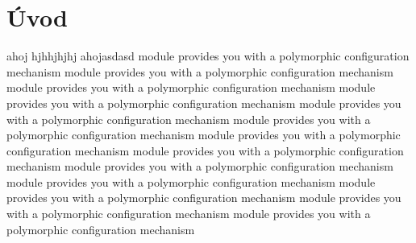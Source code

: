 

\chapter{Úvod}
ahoj
hjhhjhjhj
ahojasdasd
module provides you with a polymorphic configuration mechanism module provides you with a polymorphic configuration mechanism module provides you with a polymorphic configuration mechanism module provides you with a polymorphic configuration mechanism module provides you with a polymorphic configuration mechanism module provides you with a polymorphic configuration mechanism module provides you with a polymorphic configuration mechanism module provides you with a polymorphic configuration mechanism module provides you with a polymorphic configuration mechanism module provides you with a polymorphic configuration mechanism module provides you with a polymorphic configuration mechanism module provides you with a polymorphic configuration mechanism module provides you with a polymorphic configuration mechanism 



\cite{Turecek2011S45}
